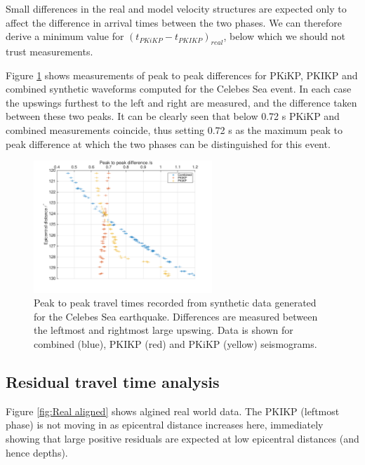 \documentclass[11pt,a4paper]{article}
\begin{document}
Small differences in the real and model velocity structures are expected only to affect the difference in arrival times between the two phases. We can therefore derive a minimum value for $ \left ( t_{PKiKP} - t_{PKIKP} \right )_{real}$, below which we should not trust measurements.

Figure \ref{fig:Min distance} shows measurements of peak to peak differences for PKiKP, PKIKP and combined synthetic waveforms computed for the Celebes Sea event. In each case the upswings furthest to the left and right are measured, and the difference taken between these two peaks. It can be clearly seen that below 0.72 s PKiKP and combined measurements coincide, thus setting 0.72 s as the maximum peak to peak difference at which the two phases can be distinguished for this event.

\begin{figure}
	\centering
	\includegraphics[width=0.6\textwidth]{figures/min_distance}
	\caption{Peak to peak travel times recorded from synthetic data generated for the Celebes Sea earthquake. Differences are measured between the leftmost and rightmost large upswing. Data is shown for combined (blue), PKIKP (red) and PKiKP (yellow) seismograms.}
	\label{fig:Min distance}
\end{figure}

\subsection{Residual travel time analysis}
Figure \ref{fig:Real aligned} shows algined real world data. The PKIKP (leftmost phase) is not moving in as epicentral distance increases here, immediately showing that large positive residuals are expected at low epicentral distances (and hence depths).
\end{document}
